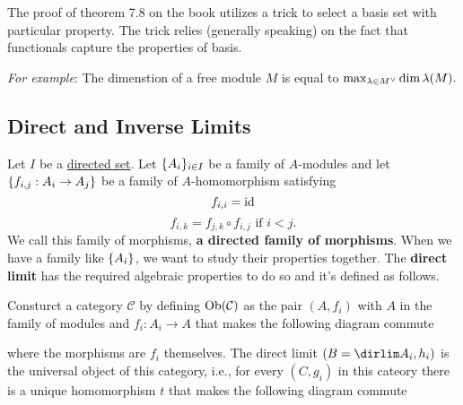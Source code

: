     \begin{remark}
        The proof of theorem 7.8 on the book utilizes a trick to select a basis set with particular property. The trick relies (generally speaking) on the fact that functionals capture the properties of basis.

        \noindent \textit{For example}: The dimenstion of a free module $M$ is equal to $\max_{\lambda \in M^{\vee}} \dim \lambda(M).$
    \end{remark}


      \subsection*{Direct and Inverse Limits}
    Let $I$ be a \href{https://en.wikipedia.org/wiki/Directed_set}{directed set}. 
    Let $\{A_i\}_{i \in I}$ be a family of $A$-modules and let$\{f_{i,j}:A_i \to A_j\}$ be a family of $A$-homomorphism satisfying
    $$
        f_{i, i} = \text{id}$$
        $$f_{i, k} = f_{j, k} \circ f_{i, j} \text{ if } i < j. 
    $$
    We call this family of morphisms, \textbf{a directed family of morphisms}. When we have a family like $\{A_i\}$, we want to study their properties together. The \textbf{direct limit} has the required algebraic properties to do so and it's defined as follows.

    Consturct a category $\mathcal{C}$ by defining $\text{Ob}(\mathcal{C})$ as the pair $(A, f_i)$ with $A$ in the family of modules and $f_i: A_i \to A$ that makes the following diagram commute

    \begin{center}
    \end{center}

    where the morphisms are $f_i$ themselves. The direct limit $(B = \dirlim A_i, h_i)$ is the universal object of this category, i.e., for every $(C, g_i)$ in this cateory there is a unique homomorphism $t$ that makes the following diagram commute



    
    
